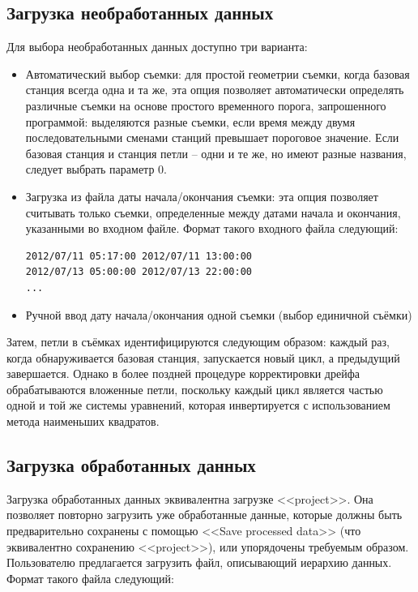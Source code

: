 \subsection[Загрузка необработанных данных]{Загрузка необработанных данных}
\label{subsec:loading_raw_data}

Для выбора необработанных данных доступно три варианта:
\begin{itemize}
    \item Автоматический выбор съемки: для простой геометрии съемки, когда
    базовая станция всегда одна и та же, эта опция позволяет автоматически
    определять различные съемки на основе простого временного порога,
    запрошенного программой: выделяются разные съемки, если время между двумя
    последовательными сменами станций превышает пороговое значение. Если базовая
    станция и станция петли -- одни и те же, но имеют разные названия,
    следует выбрать параметр 0.

    \item Загрузка из файла даты начала/окончания съемки: эта опция позволяет
    считывать только съемки, определенные между датами начала и окончания,
    указанными во входном файле. Формат такого входного файла следующий:

    \begin{verbatim}
2012/07/11 05:17:00 2012/07/11 13:00:00
2012/07/13 05:00:00 2012/07/13 22:00:00
...
    \end{verbatim}
    
    \item Ручной ввод дату начала/окончания одной съемки (выбор единичной 
    съёмки)
    
\end{itemize}

Затем, петли в съёмках идентифицируются следующим образом: каждый раз,
когда обнаруживается базовая станция, запускается новый цикл, а предыдущий
завершается. Однако в более поздней процедуре корректировки дрейфа
обрабатываются вложенные петли, поскольку каждый цикл является частью одной и
той же системы уравнений, которая инвертируется с использованием метода
наименьших квадратов.

\subsection[Загрузка обработанных данных]{Загрузка обработанных данных}
\label{subsec:loading_processed_data}

Загрузка обработанных данных эквивалентна загрузке <<project>>. Она позволяет
повторно загрузить уже обработанные данные, которые должны быть предварительно
сохранены с помощью <<Save processed data>> (что эквивалентно сохранению
<<project>>), или упорядочены требуемым образом. Пользователю предлагается
загрузить файл, описывающий иерархию данных. Формат такого файла следующий:


